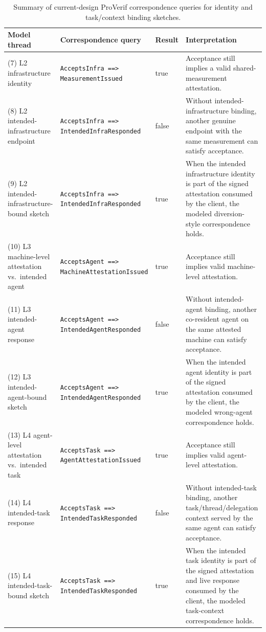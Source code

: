 \documentclass[11pt,a4paper]{article}
\newcommand{\resulttrue}{\colorbox{statusgreen}{\strut true}}
\newcommand{\resultfalse}{\colorbox{riskred}{\strut false}}
\begin{document}
\begin{table}[H]
\centering
\footnotesize
\begin{tabularx}{\textwidth}{@{}>{\raggedright\arraybackslash}p{}>{\raggedright\arraybackslash}p{}>{\centering\arraybackslash}p{}>{\raggedright\arraybackslash}X@{}}
\toprule
\textbf{Model thread} & \textbf{Correspondence query} & \textbf{Result} & \textbf{Interpretation} \\
\midrule
(7) L2 infrastructure identity &
\texttt{AcceptsInfra ==> MeasurementIssued} &
\resulttrue{} &
Acceptance still implies a valid shared-measurement attestation. \\
(8) L2 intended-infrastructure endpoint &
\texttt{AcceptsInfra ==> IntendedInfraResponded} &
\resultfalse{} &
Without intended-infrastructure binding, another genuine endpoint with the same measurement can satisfy acceptance. \\
(9) L2 intended-infrastructure-bound sketch &
\texttt{AcceptsInfra ==> IntendedInfraResponded} &
\resulttrue{} &
When the intended infrastructure identity is part of the signed attestation consumed by the client, the modeled diversion-style correspondence holds. \\
(10) L3 machine-level attestation vs.\ intended agent &
\texttt{AcceptsAgent ==> MachineAttestationIssued} &
\resulttrue{} &
Acceptance still implies valid machine-level attestation. \\
(11) L3 intended-agent response &
\texttt{AcceptsAgent ==> IntendedAgentResponded} &
\resultfalse{} &
Without intended-agent binding, another co-resident agent on the same attested machine can satisfy acceptance. \\
(12) L3 intended-agent-bound sketch &
\texttt{AcceptsAgent ==> IntendedAgentResponded} &
\resulttrue{} &
When the intended agent identity is part of the signed attestation consumed by the client, the modeled wrong-agent correspondence holds. \\
(13) L4 agent-level attestation vs.\ intended task &
\texttt{AcceptsTask ==> AgentAttestationIssued} &
\resulttrue{} &
Acceptance still implies valid agent-level attestation. \\
(14) L4 intended-task response &
\texttt{AcceptsTask ==> IntendedTaskResponded} &
\resultfalse{} &
Without intended-task binding, another task/thread/delegation context served by the same agent can satisfy acceptance. \\
(15) L4 intended-task-bound sketch &
\texttt{AcceptsTask ==> IntendedTaskResponded} &
\resulttrue{} &
When the intended task identity is part of the signed attestation and live response consumed by the client, the modeled task-context correspondence holds. \\
\bottomrule
\end{tabularx}
\caption{Summary of current-design ProVerif correspondence queries for identity and task/context binding sketches.}
\label{tab:proverif-identity-results}
\end{table}
\end{document}

